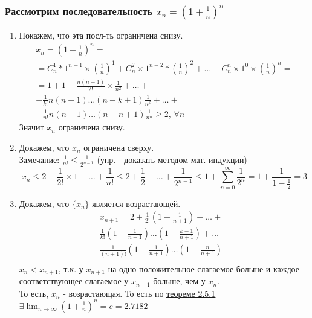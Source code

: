 \documentclass[12pt]{article}
\begin{document}
    \subsubsection*{Рассмотрим последовательность $x_n = (1+\frac{1}{n})^n$}
    \begin{enumerate}
        \item Покажем, что эта посл-ть ограничена снизу.
        \begin{gather*}
            x_n = (1 + \frac{1}{n})^n =\\
            = C^{1}_{n}*1^{n-1}\times(\frac{1}{n})^{1} + C^{2}_{n}\times1^{n-2}*(\frac{1}{n})^{2} + \dots + C^n_{n}\times1^{0}\times(\frac{1}{n})^n =\\
            = 1 + 1 + \frac{n(n-1)}{2!} \times \frac{1}{n^{2}} + \dots +\\
            + \frac{1}{k!}n(n-1)\dots(n-k+1)\frac{1}{n^{k}}+\dots+\\
            +\frac{1}{n!}n(n-1)\dots(n-n+1)\frac{1}{n^n} \ge 2 \text{, } \forall n
        \end{gather*}
        Значит $x_n$ ограничена снизу.
        \item Докажем, что $x_n$ ограничена сверху.\\
        \underline{Замечание:} $\frac{1}{n!} \le \frac{1}{2^{n-1}}$ (упр. - доказать методом мат. индукции)
        \begin{equation*}
            x_n \le 2 + \frac{1}{2!} \times 1 + \dots + \frac{1}{n!} \le 2 + \frac{1}{2} + \dots + \frac{1}{2^{n-1}} \le 1 + \sum_{n=0}^{\infty} \frac{1}{2^n} = 1 + \frac{1}{1-\frac{1}{2}} = 3
        \end{equation*}
        \item Докажем, что $\{x_n\}$ является возрастающей.\\
        \begin{gather*}
            x_{n+1} = 2 + \frac{1}{2!} (1 - \frac{1}{n+1}) + \dots +\\
            \frac{1}{k!} (1 - \frac{1}{n+1}) \dots (1 - \frac{k-1}{n+1}) + \dots +\\
            \frac{1}{(n+1)!} (1 - \frac{1}{n+1}) \dots (1 - \frac{n}{n+1})\\
        \end{gather*}
        $x_n < x_{n+1}$, т.к. у $x_{n+1}$ на одно положительное слагаемое больше и каждое соответствующее слагаемое у $x_{n+1}$ больше, чем у $x_n$.\\
        \indent То есть, $x_n$ - возрастающая. То есть по \underline{\hyperref[th:2.5.1]{теореме 2.5.1}} $\exists \lim_{n\to\infty}(1+\frac{1}{n})^n = e = 2.7182$
    \end{enumerate}
\end{document}
